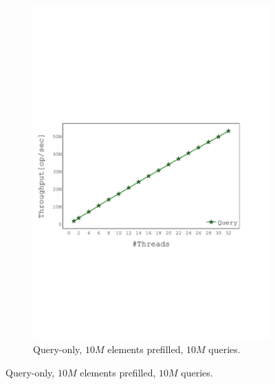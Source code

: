 \begin{figure}[h]
\begin{subfigure}[]{0.49\textwidth}
        \includegraphics[width=\textwidth,trim={0cm 7cm 1.9cm 9cm},clip] {graphics/graphs/throughput/oracle_Quancurrent_blocking_numa_query_k4096_b16_keys10M_Tup32_runs15_prefill10M_prefillT1_16-08-2022_05-38-28_flat.pdf}
        \caption{Query-only, $10M$ elements prefilled, $10M$ queries.}
        \label{fig:query_only_throughput}
    \end{subfigure}


\end{figure}
